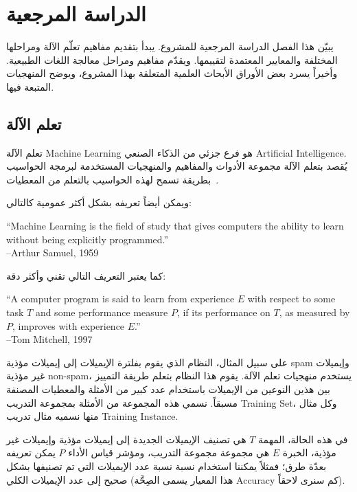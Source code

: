 


\chapter{الدراسة المرجعية}
يبيّن هذا الفصل الدراسة المرجعية للمشروع.
يبدأ بتقديم مفاهيم تعلّم الآلة ومراحلها المختلفة والمعايير المعتمدة لتقييمها.
ويقدّم مفاهيم ومراحل معالجة اللغات الطبيعية.
وأخيراً يسرد بعض الأوراق الأبحاث العلمية المتعلقة بهذا المشروع، ويوضح المنهجيات المتبعة فيها.







\section{تعلم الآلة}
\label{sec:ml}
تعلم الآلة \textenglish{Machine Learning} هو فرع جزئي من الذكاء الصنعي \textenglish{Artificial Intelligence}.
يُقصد بتعلم الآلة مجموعة الأدوات والمفاهيم والمنهجيات المستخدمة لبرمجة الحواسيب
بطريقة تسمح لهذه الحواسيب بالتعلم من المعطيات~\cite{hands-on}.

ويمكن أيضاً تعريفه بشكل أكثر عمومية كالتالي:

\begin{english}
	``Machine Learning is the field of study that gives computers the ability to learn
	without being explicitly programmed.'' \\
	--Arthur Samuel, 1959
\end{english}

كما يعتبر التعريف التالي تقني وأكثر دقة:

\begin{english}
	``A computer program is said to learn from experience $E$ with respect to some task $T$
	and some performance measure $P$, if its performance on $T$, as measured by $P$, improves
	with experience $E$.'' \\
	--Tom Mitchell, 1997
\end{english}

على سبيل المثال، النظام الذي يقوم بفلترة الإيميلات إلى إيميلات مؤذية \textenglish{spam} وإيميلات غير مؤذية \textenglish{non-spam}، يستخدم منهجيات تعلم الآلة.
يقوم هذا النظام بتعلم طريقة التمييز بين هذين النوعين من الإيميلات باستخدام عدد كبير من الأمثلة والمعطيات المصنفة مسبقاً.
نسمي هذه المجموعة من الأمثلة بمجموعة التدريب \textenglish{Training Set}، وكل مثال منها نسميه مثال تدريب \textenglish{Training Instance}.

في هذه الحالة، المهمة $T$ هي تصنيف الإيميلات الجديدة إلى إيميلات مؤذية وإيميلات غير مؤذية، الخبرة $E$ هي مجموعة مجموعة التدريب،
ومؤشر قياس الأداء $P$ يمكن تعريفه بعدّة طرق؛ فمثلاً يمكننا استخدام نسبة نسبة عدد الإيميلات التي تم تصنيفها بشكل صحيح إلى عدد الإيميلات الكلي
(هذا المعيار يسمى الصِحَّة \textenglish{Accuracy} كم سنرى لاحقاً).

